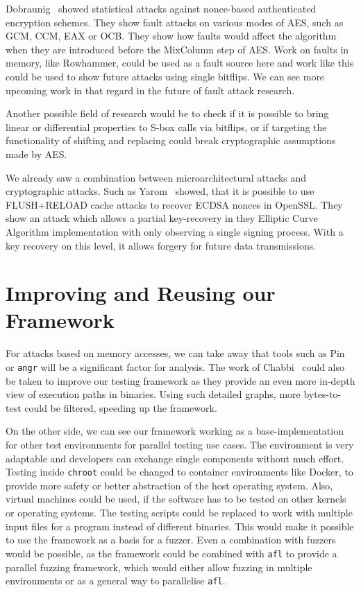 Dobraunig~\etal\cite{noncestat} showed statistical attacks against nonce-based
authenticated encryption schemes. They show fault attacks on various modes of
AES, such as GCM, CCM, EAX or OCB. They show how faults would affect the
algorithm when they are introduced before the MixColumn step of AES. Work on
faults in memory, like Rowhammer, could be used as a fault source here and work
like this could be used to show future attacks using single bitflips. We can see
more upcoming work in that regard in the future of fault attack research.

Another possible field of research would be to check if it is possible to bring
linear or differential properties to S-box calls via bitflips, or if targeting
the functionality of shifting and replacing could break cryptographic
assumptions made by AES.

We already saw a combination between microarchitectural attacks and
cryptographic attacks. Such as Yarom~\etal\cite{noncerec} showed, that it is
possible to use FLUSH+RELOAD cache attacks to recover ECDSA nonces in OpenSSL.
They show an attack which allows a partial key-recovery in they Elliptic Curve
Algorithm implementation with only observing a single signing process. With a
key recovery on this level, it allows forgery for future data transmissions.

\section{Improving and Reusing our Framework}

For attacks based on memory accesses, we can take away that tools such as
Pin\cite{pintool} or \texttt{angr}\cite{angrpaper} will be a significant
factor for analysis. The work of Chabbi~\etal\cite{pincallpaths} could also be
taken to improve our testing framework as they provide an even more in-depth
view of execution paths in binaries. Using such detailed graphs, more
bytes-to-test could be filtered, speeding up the framework.

On the other side, we can see our framework working as a base-implementation for
other test environments for parallel testing use cases. The environment is very
adaptable and developers can exchange single components without much effort.
Testing inside \texttt{chroot} could be changed to container environments like
Docker\cite{docker}, to provide more safety or better abstraction of the host
operating system. Also, virtual machines could be used, if the software has to
be tested on other kernels or operating systems. The testing scripts could be
replaced to work with multiple input files for a program instead of different
binaries. This would make it possible to use the framework as a basis for a
fuzzer. Even a combination with fuzzers would be possible, as the framework
could be combined with \texttt{afl}\cite{aflweb} to provide a parallel fuzzing
framework, which would either allow fuzzing in multiple environments or as a
general way to parallelise \texttt{afl}.

